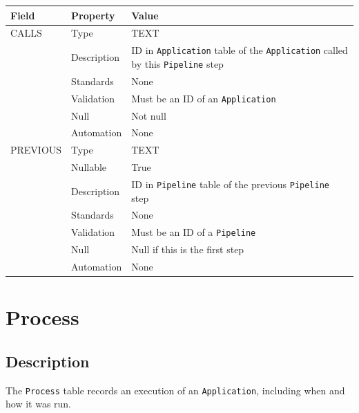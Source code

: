 \documentclass[
]{article}
\newcounter{none} %
\begin{document}
{\def\LTcaptype{none} %
\begin{longtable}[]{@{}
  >{\raggedright\arraybackslash}p{}
  >{\raggedright\arraybackslash}p{}
  >{\raggedright\arraybackslash}p{}@{}}
\toprule\noalign{}
\begin{minipage}[b]{\linewidth}\raggedright
Field
\end{minipage} & \begin{minipage}[b]{\linewidth}\raggedright
Property
\end{minipage} & \begin{minipage}[b]{\linewidth}\raggedright
Value
\end{minipage} \\
\midrule\noalign{}
\endhead
\bottomrule\noalign{}
\endlastfoot
CALLS & Type & TEXT \\
& Description & ID in \texttt{Application} table of the
\texttt{Application} called by this \texttt{Pipeline} step \\
& Standards & None \\
& Validation & Must be an ID of an \texttt{Application} \\
& Null & Not null \\
& Automation & None \\
PREVIOUS & Type & TEXT \\
& Nullable & True \\
& Description & ID in \texttt{Pipeline} table of the previous
\texttt{Pipeline} step \\
& Standards & None \\
& Validation & Must be an ID of a \texttt{Pipeline} \\
& Null & Null if this is the first step \\
& Automation & None \\
\end{longtable}
}

\section{Process}\label{process}

\subsection{Description}\label{description-23}

The \texttt{Process} table records an execution of an
\texttt{Application}, including when and how it was run.
\end{document}
